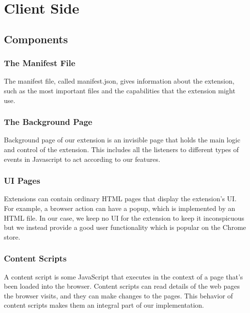 \chapter{Client Side}
\section{Components}
\subsection{The Manifest File}
The manifest file, called manifest.json, gives information about the extension, such as the most important files and the capabilities that the extension might use. 
\subsection{The Background Page}
Background page of our extension is an invisible page that holds the main logic and control of the extension.
This includes all the listeners to different types of events in Javascript to act according to our features.

\subsection{UI Pages}
Extensions can contain ordinary HTML pages that display the extension's UI. For example, a browser action can have a popup, which is implemented by an HTML file. In our case, we keep no UI for the extension to keep it inconspicuous but we instead provide a good user functionality which is popular on the Chrome store.

\subsection{Content Scripts}
A content script is some JavaScript that executes in the context of a page that's been loaded into the browser. Content scripts can read details of the web pages the browser visits, and they can make changes to the pages. This behavior of content scripts makes them an integral part of our implementation.
